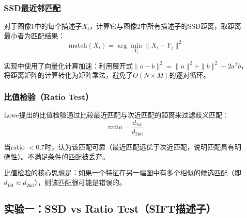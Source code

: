 \documentclass[12pt]{article}
\begin{document}
\subsubsection{SSD最近邻匹配}

对于图像1中的每个描述子$X_i$，计算它与图像2中所有描述子的SSD距离，取距离最小者为匹配结果：
\begin{equation}
\text{match}(X_i) = \arg\min_{Y_j} \|X_i - Y_j\|^2
\end{equation}

实现中使用了向量化计算加速：利用展开式$\|a-b\|^2 = \|a\|^2 + \|b\|^2 - 2a^Tb$，将距离矩阵的计算转化为矩阵乘法，避免了$O(N \times M)$的逐对循环。

\subsubsection{比值检验（Ratio Test）}

Lowe提出的比值检验通过比较最近匹配与次近匹配的距离来过滤歧义匹配：
\begin{equation}
\text{ratio} = \frac{d_{\text{1st}}}{d_{\text{2nd}}}
\end{equation}

当ratio $< 0.7$时，认为该匹配可靠（最近匹配远优于次近匹配，说明匹配具有明确性）。不满足条件的匹配被丢弃。

比值检验的核心思想是：如果一个特征在另一幅图中有多个相似的候选匹配（即$d_{\text{1st}} \approx d_{\text{2nd}}$），则该匹配很可能是错误的。

\subsection{实验一：SSD vs Ratio Test（SIFT描述子）}
\end{document}
